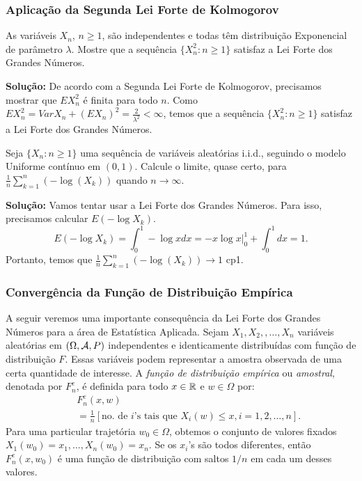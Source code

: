 \begin{frame}
\frametitle{\textbf{Aplicação da Segunda Lei Forte de
Kolmogorov}}



\begin{exem}
As variáveis $X_n$, $n\geq 1$, são independentes e todas têm distribuição Exponencial de parâmetro $\lambda$. Mostre que a sequência $\{X_n^2:n\geq 1\}$ satisfaz a Lei Forte dos Grandes Números.

{\bf Solução:} De acordo com a Segunda Lei Forte de Kolmogorov, precisamos mostrar que $EX_n^2$ é finita para todo $n$. Como $EX_n^2=Var X_n +(EX_n)^2=\frac{2}{\lambda^2}<\infty$, temos que a sequência $\{X_n^2:n\geq 1\}$ satisfaz a Lei Forte dos Grandes Números.
\end{exem}

\begin{exem}
	Seja $\{X_n:n\geq 1\}$ uma sequência de variáveis aleatórias i.i.d., seguindo o modelo Uniforme contínuo em $(0,1)$. Calcule o limite, quase certo, para $\frac{1}{n}\sum_{k=1}^{n}(-\log(X_k))$ quando $n\rightarrow\infty$.
	
	{\bf Solução:} Vamos tentar usar a Lei Forte dos Grandes Números. Para isso, precisamos calcular $E(-\log X_k)$.
	$$E(-\log X_k)=\int_{0}^{1}-\log xdx=-x\log x|_{0}^{1}+\int_{0}^{1}dx=1.$$
	Portanto, temos que $\frac{1}{n}\sum_{k=1}^{n}(-\log(X_k))\rightarrow 1$ cp1.
\end{exem}


\end{frame}

%
%
%

\begin{frame}
\frametitle{\textbf{Convergência da Função de Distribuição Empírica}}
A seguir veremos uma importante consequência da Lei Forte dos Grandes Números para a área de Estatística Aplicada. Sejam $X_1,X_2,,\ldots,X_n$ variáveis aleatórias em $(\Omega,{\cal A},P)$ independentes e identicamente distribuídas com função de distribuição $F$. Essas variáveis podem representar a amostra observada de uma certa quantidade de interesse. A {\em função de distribuição empírica} ou {\em amostral}, denotada por $F_n^e$, é definida para todo $x\in \mathbb{R}$ e $w\in\Omega$ por:
\begin{eqnarray}
&  & F_n^e(x,w)\nonumber\\
& & =\frac{1}{n}[\mbox{no. de $i$'s tais que $X_i(w)\leq x,i=1,2,\ldots,n$}].\nonumber
\end{eqnarray}
Para uma particular trajetória $w_0\in\Omega$, obtemos o conjunto de valores fixados $X_1(w_0)=x_1,\ldots,X_n(w_0)=x_n.$ Se os $x_i$'s são todos diferentes, então $F_n^e(x,w_0)$ é uma função de distribuição com saltos $1/n$ em cada um desses valores.
\end{frame}

